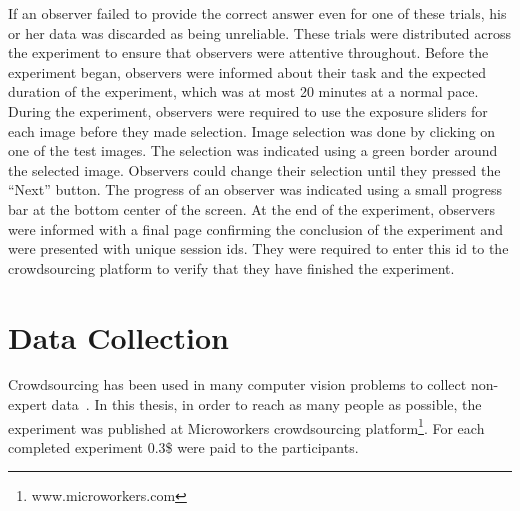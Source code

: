If an observer failed to provide the correct answer even for one of these trials, his or her data was discarded as being unreliable. These trials were distributed across the experiment to ensure that observers were attentive throughout. Before the experiment began, observers were informed about their task and the expected duration of the experiment, which was at most 20 minutes at a normal pace. During the experiment, observers were required to use the exposure sliders for each image before they made selection. Image selection was done by clicking on one of the test images. The selection was indicated using a green border around the selected image. Observers could change their selection until they pressed the “Next” button. The progress of an observer was indicated using a small progress bar at the bottom center of the screen. At the end of the experiment, observers were informed with a final page confirming the conclusion of the experiment and were presented with unique session ids. They were required to enter this id to the crowdsourcing platform to verify that they have finished the experiment.

\section{Data Collection}
\label{sec:crowd_sourcing}
Crowdsourcing has been used in many computer vision problems to collect non-expert data~\cite{kovashka2016crowdsourcing}. In this thesis, in order to reach as many people as possible, the experiment was published at Microworkers crowdsourcing platform\footnote{www.microworkers.com}. For each completed experiment 0.3\$ were paid to the participants.

